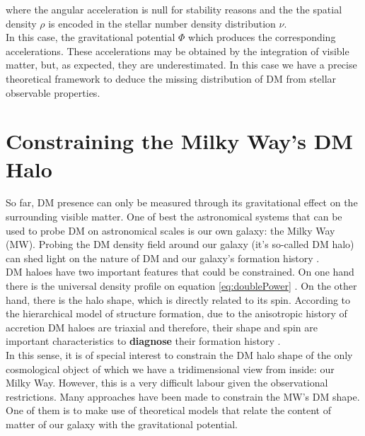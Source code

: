 where the angular acceleration is null for stability reasons and the the spatial density $\rho$ is encoded in the stellar number density distribution $\nu$.\\

In this case, the gravitational potential $\Phi$ which produces the corresponding accelerations. These accelerations may be obtained by the integration of visible matter, but, as expected, they are underestimated. In this case we have a precise theoretical framework to deduce the missing distribution of DM from stellar observable properties.\\


\section{Constraining the Milky Way's DM Halo}
So far, DM presence can only be measured through its gravitational effect on the surrounding visible matter. 
One of best the astronomical systems that can be used to probe DM on astronomical scales is our own galaxy: the Milky Way (MW).
Probing the DM density field around our galaxy (it's so-called DM halo) can shed light on the nature of DM \cite{Read_and_Moore_2005,Nipoti_et_al._2007} and our
galaxy's formation history \cite{Read_et_al._2008,Read_et_al._2009,Vera-Ciro_et_al._2011}.\\

DM haloes have two important features that could be constrained. 
On one hand there is the universal density profile on equation \eqref{eq:doublePower} \cite{Navarro_et_al._2010}. 
On the other hand, there is the halo shape, which is directly related to its spin. 
According to the hierarchical model of structure formation, due to the anisotropic history of accretion DM haloes are triaxial and therefore, their shape and spin are important characteristics to \textbf{diagnose} their formation history \cite{Bardeen_1986,Vera-Ciro_and_Helmi_2013}.\\

In this sense, it is of special interest to constrain the DM halo shape of the only cosmological object of which we have a tridimensional view from inside: our Milky Way. However, this is a very difficult labour given the observational restrictions. Many approaches have been made to constrain the MW's DM shape. One of them is to make use of theoretical models that relate the content of matter of our galaxy with the gravitational potential.\\

